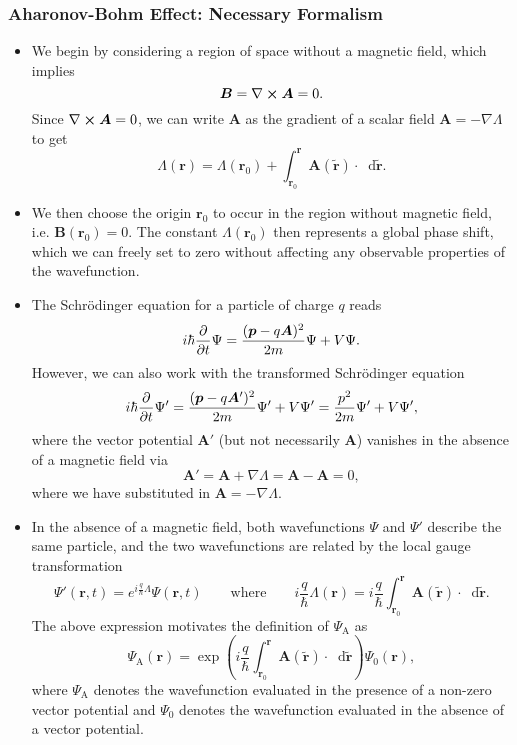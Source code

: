\documentclass[11pt, a4paper]{article}
\newcommand{\diff}{\mathop{}\!\mathrm{d}} %
\renewcommand{\curl}{\nabla \cross}
\renewcommand{\grad}{\nabla}
\newcommand{\Schro}{Schr\"{o}dinger\xspace}
\renewcommand{\vec}[1]{\bm{#1}}  %
\renewcommand{\t}[1]{\tilde{#1}}
\renewcommand{\r}{\vec{r}}  %
\newcommand{\A}{\vec{A}}  %
\newcommand{\B}{\vec{B}}  %
\renewcommand{\P}{\Psi}  %
\begin{document}
\subsubsection{Aharonov-Bohm Effect: Necessary Formalism}
\begin{itemize}
	\item We begin by considering a region of space without a magnetic field, which implies
	\begin{equation*}
		\B = \curl \A = 0.
	\end{equation*} 
	Since $ \curl \A = 0 $, we can write $ \A $ as the gradient of a scalar field $ \A = - \grad \Lambda $ to get
	\begin{equation*}
		\Lambda(\r) = \Lambda(\r_{0}) + \int_{\r_{0}}^{\r}\A(\t{\r})\cdot \diff \t{\r}.
	\end{equation*}
	
	\item We then choose the origin $ \r_{0} $ to occur in the region without magnetic field, i.e. $ \B(\r_{0}) = 0 $. The constant $ \Lambda(\r_{0}) $ then represents a global phase shift, which we can freely set to zero without affecting any observable properties of the wavefunction.

    \item The \Schro equation for a particle of charge $ q $ reads
	\begin{equation*}
		i\hbar \pdv{t}\P = \frac{(\vec{p} - q \A)^{2}}{2m} \P + V\P.
	\end{equation*}
	However, we can also work with the transformed \Schro equation
	\begin{equation*}
		i\hbar \pdv{t}\P' = \frac{(\vec{p} - q \A')^{2}}{2m} \P' + V\P' = \frac{p^{2}}{2m}\P' + V\P',
	\end{equation*}
	where the vector potential $ \A' $ (but not necessarily $ \A $) vanishes in the absence of a magnetic field via
	\begin{equation*}
		\A' = \A + \grad \Lambda = \A - \A = 0,
	\end{equation*}
    where we have substituted in $ \A = - \grad \Lambda $.
	
	
	\item In the absence of a magnetic field, both wavefunctions $ \P $ and $ \P' $ describe the same particle, and the two wavefunctions are related by the local gauge transformation
	\begin{equation*}
        \P'(\r, t) = e^{i\frac{q}{\hbar} \Lambda} \P(\r, t) \qquad \text{where} \qquad  i \frac{q}{\hbar}\Lambda(\r) = i \frac{q}{\hbar} \int_{\r_{0}}^{\r}\A(\tilde{\r}) \cdot \diff \tilde{\r}.
	\end{equation*}
    The above expression motivates the definition of $ \Psi_{\text{A}} $ as
	\begin{equation*}
		\P_{\text{A}}(\r) = \exp\left(i\frac{q}{\hbar} \int_{\r_{0}}^{\r}\A(\t{\r})\cdot \diff\t{\r}\right) \P_{0}(\r),
	\end{equation*}
	where $ \P_{\text{A}} $ denotes the wavefunction evaluated in the presence of a non-zero vector potential and $ \P_{0} $ denotes the wavefunction evaluated in the absence of a vector potential.
\end{itemize}
\end{document}
